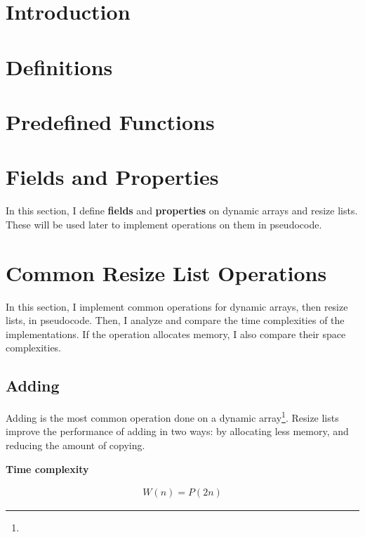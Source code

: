 \documentclass{article}
\newcommand{\tcomplex}{\textbf{Time complexity}}
\newcommand{\nwritesfn}{W}
\newcommand{\biggo}{P}
\newcommand{\varnitems}{n}
\begin{document}
	\begin{abstract}
	\end{abstract}

	\section{Introduction}

	\section{Definitions}

	\section{Predefined Functions}
	
	\section{Fields and Properties}
	
	In this section, I define \textbf{fields} and \textbf{properties} on dynamic arrays and resize lists. These will be used later to implement operations on them in pseudocode.
	
	\section{Common Resize List Operations}
	
	In this section, I implement common operations for dynamic arrays, then resize lists, in pseudocode. Then, I analyze and compare the time complexities of the implementations. If the operation allocates memory, I also compare their space complexities.
	
	\subsection{Adding}
	
	Adding is the most common operation done on a dynamic array\footnote{}. Resize lists improve the performance of adding in two ways: by allocating less memory, and reducing the amount of copying.
	
	
	\tcomplex
	
	\begin{align*}
	\nwritesfn(\varnitems) = \biggo(2\varnitems)
	\end{align*}
	
\end{document}
